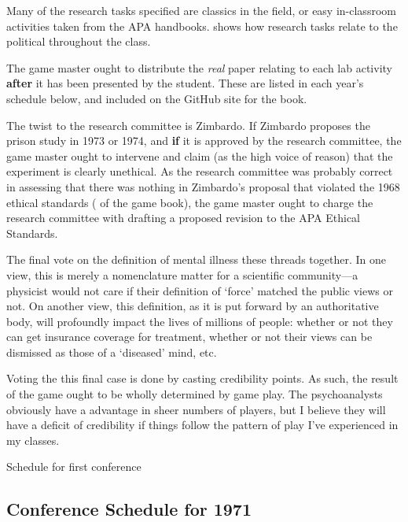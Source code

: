 \begin{refsection}
Many of the research tasks specified are classics in the field, or easy in-classroom activities taken from the APA handbooks.  shows how research tasks relate to the political throughout the class.

The game master ought to distribute the \emph{real} paper relating to each lab activity \textbf{after} it has been presented by the student. These are listed in each year’s schedule below, and included on the GitHub site for the book.

The twist to the research committee is Zimbardo. If Zimbardo proposes the prison study in 1973 or 1974, and \textbf{if} it is approved by the research committee, the game master ought to intervene and claim (as the high voice of reason) that the experiment is clearly unethical. As the research committee was probably correct in assessing that there was nothing in Zimbardo’s proposal that violated the 1968 ethical standards ( of the game book), the game master ought to charge the research committee with drafting a proposed revision to the APA Ethical Standards.

 The final vote on the definition of mental illness these threads together. In one view, this is merely a nomenclature matter for a scientific community---a physicist would not care if their definition of ‘force’ matched the public views or not. On another view, this definition, as it is put forward by an authoritative body, will profoundly impact the lives of millions of people: whether or not they can get insurance coverage for treatment, whether or not their views can be dismissed as those of a ‘diseased’ mind, etc.

Voting the this final case is done by casting credibility points. As such, the result of the game ought to be wholly determined by game play. The psychoanalysts obviously have a advantage in sheer numbers of players, but I believe they will have a deficit of credibility if things follow the pattern of play I’ve experienced in my classes.

\newpage


\begin{apatextbox}{Schedule for first conference}

\subsection{Conference Schedule for 1971}
\label{conferenceschedulefor1971}


\end{apatextbox}
\end{refsection}
